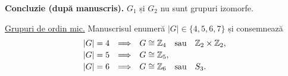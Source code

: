 \medskip
\noindent\textbf{Concluzie (după manuscris).}
$G_1$ și $G_2$ nu sunt grupuri izomorfe.

\medskip
\noindent\underline{Grupuri de ordin mic.}
Manuscrisul enumeră $|G|\in\{4,5,6,7\}$ și consemnează
\[
\begin{array}{r@{\quad\Longrightarrow\quad}l}
 |G|=4 & G\cong\mathbb Z_4\quad\text{sau}\quad
               \mathbb Z_2\times\mathbb Z_2,\\[2pt]
 |G|=5 & G\cong\mathbb Z_5,\\[2pt]
 |G|=6 & G\cong\mathbb Z_6\quad\text{sau}\quad S_3.
\end{array}
\]
